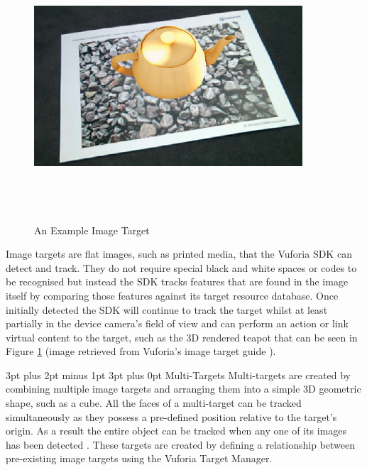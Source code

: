 \documentclass[12pt,a4paper]{article}
\makeatletter
\renewcommand\paragraph{\@startsection {paragraph}{1}{0mm} %
	                           {3pt plus 2pt minus 1pt} %
	                           {3pt plus 0pt} %
	                           {\normalfont}}
\makeatother
\begin{document}
\begin{figure}[!h]
	\centering
	\includegraphics[width=10cm,height=10cm,keepaspectratio]{images/imagetarget}
	\caption{An Example Image Target}
	\label{fig_imagetarget}
\end{figure}

Image targets are flat images, such as printed media, that the Vuforia SDK can detect and track. They do not require special black and white spaces or codes to be recognised but instead the SDK tracks features that are found in the image itself by comparing those features against its target resource database. Once initially detected the SDK will continue to track the target whilst at least partially in the device camera's field of view and can perform an action or link virtual content to the target, such as the 3D rendered teapot that can be seen in Figure \ref{fig_imagetarget} (image retrieved from Vuforia's image target guide \cite{vuforiaimagetargets}).

\paragraph{Multi-Targets}
Multi-targets are created by combining multiple image targets and arranging them into a simple 3D geometric shape, such as a cube. All the faces of a multi-target can be tracked simultaneously as they possess a pre-defined position relative to the target's origin. As a result the entire object can be tracked when any one of its images has been detected  \cite{vuforiamultitargets}. These targets are created by defining a relationship between pre-existing image targets using the Vuforia Target Manager.
\end{document}
